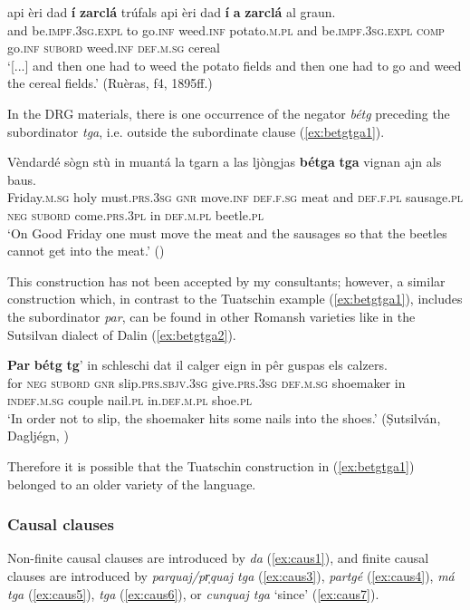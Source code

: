 \ea
\label{ex:purp:inf:7}
\gll [...] api èri dad \textbf{í} \longrule {} \textbf{zarclá} trúfals api èri dad \textbf{í} \textbf{a} \textbf{zarclá} al graun.   \\
{} and be.\textsc{impf.3sg.expl} to go.\textsc{inf} {} weed.\textsc{inf} potato.\textsc{m.pl} and be.\textsc{impf.3sg.expl} \textsc{comp} go.\textsc{inf} \textsc{subord} weed.\textsc{inf} \textsc{def.m.sg} cereal\\
\glt `[...] and then one had to weed the potato fields and then one had to go and weed the cereal fields.' (Ruèras, f4, 1895ff.)
\z

In the DRG materials, there is one occurrence of the negator \textit{bétg} preceding the subordinator \textit{tga}, i.e. outside the subordinate clause (\ref{ex:betgtga1}).

\ea
\label{ex:betgtga1}
\gll Vèndardé sògn stù in muantá la tgarn a las ljòngjas \textbf{bétga} \textbf{tga} vignan ajn als baus.\\
Friday.\textsc{m.sg} holy must.\textsc{prs.3sg} \textsc{gnr} move.\textsc{inf} \textsc{def.f.sg} meat and \textsc{def.f.pl} sausage.\textsc{pl} \textsc{neg} \textsc{subord} come.\textsc{prs.3pl} in \textsc{def.m.pl} beetle.\textsc{pl}\\
\glt `On Good Friday one must move the meat and the sausages so that the beetles cannot get into the meat.' ()
\z

This construction has not been accepted by my consultants; however, a similar construction which, in contrast to the Tuatschin example (\ref{ex:betgtga1}), includes the subordinator \textit{par}, can be found in other Romansh varieties like in the Sutsilvan dialect of Dalin (\ref{ex:betgtga2}).

\ea\label{ex:betgtga2}
\gll  \textbf{Par} \textbf{bétg} \textbf{tg}' in schleschi dat il calger eign in pêr guspas els calzers.\\
     for \textsc{neg} \textsc{subord} \textsc{gnr} slip.\textsc{prs.sbjv.3sg} give.\textsc{prs.3sg} \textsc{def.m.sg} shoemaker in \textsc{indef.m.sg} couple nail.\textsc{pl} in.\textsc{def.m.pl} shoe.\textsc{pl}\\
\glt `In order not to slip, the shoemaker hits some nails into the shoes.' (Ṣutsilván, Dagljégn, )
\z

Therefore it is possible that the Tuatschin construction in (\ref{ex:betgtga1}) belonged to an older variety of the language.


\subsubsection{Causal clauses}
Non-finite causal clauses are introduced by \textit{da} (\ref{ex:caus1}), and finite causal clauses are introduced by \textit{parquaj/pr̩quaj tga} (\ref{ex:caus3}), \textit{partgé} (\ref{ex:caus4}), \textit{má tga} (\ref{ex:caus5}), \textit{tga} (\ref{ex:caus6}), or \textit{cunquaj tga} `since' (\ref{ex:caus7}).
 

